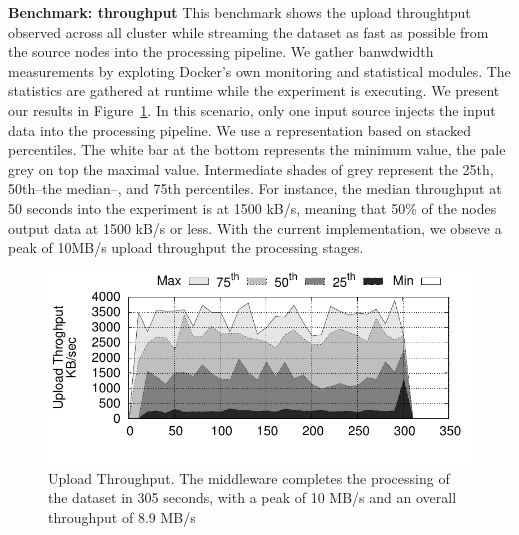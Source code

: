 \textbf{Benchmark: throughput}
This benchmark shows the upload throughtput observed across all cluster while streaming the dataset as fast as possible from the source nodes into the processing pipeline.
We gather banwdwidth measurements by exploting Docker's own monitoring and statistical modules.
The statistics are gathered at runtime while the experiment is executing.
We present our results in Figure~\ref{fig:throughput}.
In this scenario, only one input source injects the input data into the processing pipeline.
We use a representation based on stacked percentiles. 
The white bar at the bottom represents the minimum value, the pale grey on top the maximal value. 
Intermediate shades of grey represent the 25th, 50th–the median–, and 75th percentiles. 
For instance, the median throughput at 50 seconds into the experiment is at 1500 kB/s, meaning that 50\% of the nodes output data at 1500 kB/s or less.
With the current implementation, we obseve a peak of 10MB/s upload throughput the processing stages.


\begin{figure}[t!]
  \centering
  \includegraphics[scale=0.7]{images/tput_upload}
  \caption{Upload Throughput. The middleware completes the processing of the dataset in 305 seconds, with a peak of 10 MB/s and an overall throughput of 8.9 MB/s}
  \label{fig:throughput}
\end{figure}

